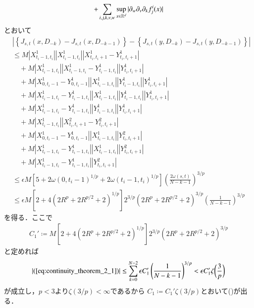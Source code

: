 \begin{prf}
\begin{description}
\begin{align}
						+ \sum_{i,j,k,v,w} \operatorname*{sup}_{x \in \mathbb{R}^d} |\partial_w \partial_v \partial_k f^i_j(x)|
					\label{eq:continuity_theorem_2_4}
				\end{align}
				とおいて
				\begin{align}
					&\left| \left\{ J_{s,t}(x,D_{-k}) - J_{s,t}(x,D_{-k-1}) \right\} - 
						\left\{ J_{s,t}(y,D_{-k}) - J_{s,t}(y,D_{-k-1}) \right\} \right| \\
					&\leq M \left|X^1_{t_i-1,t_i}\right| \left|X^1_{t_i-1,t_i}\right| \left| X^1_{t_i,t_i+1} - Y^1_{t_i,t_i+1} \right| \\
						&\quad + M \left| X^1_{t_i-1,t_i} \right| \left| X^1_{t_i-1,t_i} - Y^1_{t_i-1,t_i} \right| \left| Y^1_{t_i,t_i+1} \right| \\
						&\quad + M \left| X^1_{0,t_i-1} - Y^1_{0,t_i-1} \right| \left| X^1_{t_i-1,t_i} \right| \left| Y^1_{t_i-1,t_i} \right| \left| Y^1_{t_i,t_i+1} \right| \\
						&\quad + M \left| X^1_{t_i-1,t_i} - Y^1_{t_i-1,t_i} \right| \left| X^1_{t_i-1,t_i} \right| \left| Y^1_{t_i-1,t_i} \right| \left| Y^1_{t_i,t_i+1} \right| \\
						&\quad + M \left| X^1_{t_i-1,t_i} - Y^1_{t_i-1,t_i} \right| \left| Y^1_{t_i-1,t_i} \right| \left| Y^1_{t_i,t_i+1} \right| \\
						&\quad + M \left| X^1_{t_i-1,t_i} \right| \left| X^2_{t_i,t_i+1} - Y^2_{t_i,t_i+1} \right| \\
						&\quad + M \left| X^1_{0,t_i-1} - Y^1_{0,t_i-1} \right| \left| X^1_{t_i-1,t_i} \right| \left| Y^2_{t_i,t_i+1} \right| \\
						&\quad + M \left| X^1_{t_i-1,t_i} - Y^1_{t_i-1,t_i} \right| \left| X^1_{t_i-1,t_i} \right| \left| Y^2_{t_i,t_i+1} \right| \\
						&\quad + M \left| X^1_{t_i-1,t_i} - Y^1_{t_i-1,t_i} \right| \left| Y^2_{t_i,t_i+1} \right| \\
					&\leq \epsilon M \left[5 + 2\omega(0,t_i-1)^{1/p} + 2\omega(t_i-1,t_i)^{1/p} \right] \left( \frac{2\omega(s,t)}{N-k-1} \right)^{3/p} \\
					&\leq \epsilon M \left[2 + 4\left( 2 R^p + 2R^{p/2} + 2 \right)^{1/p} \right] 2^{3/p} \left( 2 R^p + 2R^{p/2} + 2 \right)^{3/p} \left( \frac{1}{N-k-1} \right)^{3/p}
				\end{align}
				を得る．ここで
				\begin{align}
					C_1' \coloneqq  M \left[2 + 4\left( 2 R^p + 2R^{p/2} + 2 \right)^{1/p} \right] 2^{3/p} \left( 2 R^p + 2R^{p/2} + 2 \right)^{3/p}
				\end{align}
				と定めれば
				\begin{align}
					|(\refeq{eq:continuity_theorem_2_1})| \leq
					\sum_{k=0}^{N-2} \epsilon C_1' \left( \frac{1}{N-k-1} \right)^{3/p}
					< \epsilon C_1' \zeta \biggl( \frac{3}{p} \biggr)
				\end{align}
				が成立し，$p < 3$より$\zeta(3/p) < \infty$であるから
				$C_1 \coloneqq C_1' \zeta(3/p)$とおいて()が出る．
			

\end{description}
\end{prf}
